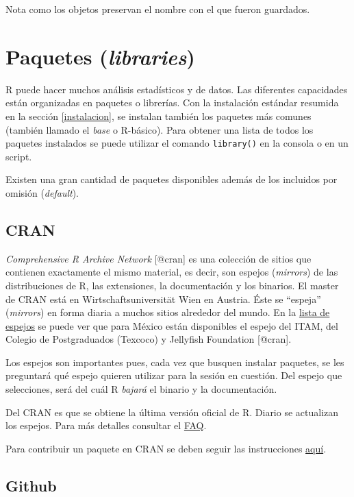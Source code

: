 \documentclass[]{article}
\begin{document}
Nota como los objetos preservan el nombre con el que fueron guardados.

\section{Paquetes (\emph{libraries})}\label{paquetes-libraries}

R puede hacer muchos análisis estadísticos y de datos. Las diferentes
capacidades están organizadas en paquetes o librerías. Con la
instalación estándar resumida en la sección \ref{instalacion}, se
instalan también los paquetes más comunes (también llamado el
\emph{base} o R-básico). Para obtener una lista de todos los paquetes
instalados se puede utilizar el comando \texttt{library()} en la consola
o en un script.

Existen una gran cantidad de paquetes disponibles además de los
incluidos por omisión (\emph{default}).

\subsection{CRAN}\label{cran}

\emph{Comprehensive R Archive Network} {[}@cran{]} es una colección de
sitios que contienen exactamente el mismo material, es decir, son
espejos (\emph{mirrors}) de las distribuciones de R, las extensiones, la
documentación y los binarios. El master de CRAN está en
Wirtschaftsuniversität Wien en Austria. Éste se ``espeja''
(\emph{mirrors}) en forma diaria a muchos sitios alrededor del mundo. En
la \href{https://cran.r-project.org/mirrors.html}{lista de espejos} se
puede ver que para México están disponibles el espejo del ITAM, del
Colegio de Postgraduados (Texcoco) y Jellyfish Foundation {[}@cran{]}.

Los espejos son importantes pues, cada vez que busquen instalar
paquetes, se les preguntará qué espejo quieren utilizar para la sesión
en cuestión. Del espejo que selecciones, será del cuál R \emph{bajará}
el binario y la documentación.

Del CRAN es que se obtiene la última versión oficial de R. Diario se
actualizan los espejos. Para más detalles consultar el
\href{https://cran.r-project.org/doc/FAQ/R-FAQ.html}{FAQ}.

Para contribuir un paquete en CRAN se deben seguir las instrucciones
\href{https://cran.r-project.org/web/packages/policies.html}{aquí}.

\subsection{Github}\label{github}
\end{document}
